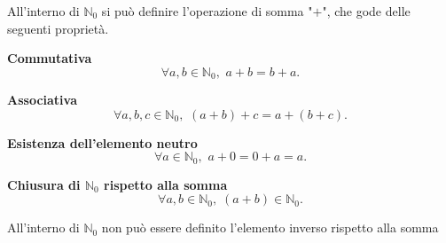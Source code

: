 All'interno di $\mathbb{N}_0$ si può definire l'operazione di somma "$+$", che gode delle seguenti proprietà.

\begin{property}
    \textbf{Commutativa}
    \[\forall a, b \in \mathbb{N}_0, \, \, a + b = b + a.\]
\end{property}
\begin{property}
    \textbf{Associativa}
    \[\forall a, b, c \in \mathbb{N}_0, \, \,  (a + b) + c = a + (b + c).\]
\end{property}
\begin{property}
    \textbf{Esistenza dell'elemento neutro}
    \[\forall a \in \mathbb{N}_0, \, \,  a + 0 = 0 + a = a.\]
\end{property}
\begin{property}
    \textbf{Chiusura di $\mathbb{N}_0$ rispetto alla somma} 
    \[\forall a, b \in \mathbb{N}_0, \; (a + b) \in \mathbb{N}_0.\]
\end{property}

\begin{observation}
    All'interno di $\mathbb{N}_0$ non può essere definito l'elemento inverso rispetto alla somma
\end{observation}